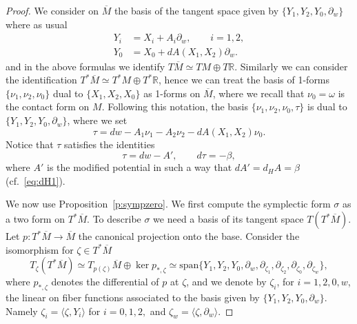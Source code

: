\documentclass{amsart}
\theoremstyle{plain}
\theoremstyle{definition}
\theoremstyle{remark}
\newcommand{\R}{\mathbb{R}}
\newcommand{\lift}[1]{\overline{#1}} 							%
\begin{document}
\begin{proof} We consider on $\lift M$ the basis of the tangent space given by $\{Y_{1},Y_{2},Y_{0},\partial_{w}\}$ where as usual
\begin{align}
Y_{i}&=X_{i}+A_{i}\partial_{w},\qquad i=1,2, \label{eq:db20} \\
Y_{0}&=X_{0}+dA(X_{1},X_{2})\partial_{w}.
\end{align}
and in the above formulas we identify $T \lift M\simeq  TM \oplus T\R$. Similarly we can consider the identification $T^{*}\lift M\simeq  T^{*}M \oplus T^{*}\R$, hence we can treat the basis of 1-forms $\{\nu_{1},\nu_{2},\nu_{0}\}$ dual to $\{X_{1},X_{2},X_{0}\}$ as 1-forms on $\lift M$, where we recall that $\nu_0=\omega$ is the contact form  on $M$. 
Following this notation, the basis $\{\nu_{1},\nu_{2},\nu_{0},\tau\}$ is dual to $\{Y_{1},Y_{2},Y_{0},\partial_{w}\}$, where we set
\begin{equation}\label{eq:tau1db}
\tau=dw-A_{1}\nu_{1}-A_{2}\nu_{2}-dA(X_{1},X_{2})\nu_{0}.
\end{equation}
Notice that $\tau$ satisfies the identities
\begin{equation}\label{eq:taudb}
\tau=dw-A',\qquad d\tau=-\beta,
\end{equation}
where $A'$ is the modified  potential in such a way that $dA'=d_{H}A=\beta$ (cf.\ \eqref{eq:dH1}).

We now use Proposition~\ref{p:sympzero}. We first compute the symplectic form $\sigma$ as a two form on $T^{*}\lift M$.  To describe $\sigma$ we need a basis of its tangent space $T(T^{*}\lift M)$. Let $p:T^{*}\lift M\to \lift M$ the canonical projection onto the base. Consider the isomorphism for $\zeta\in T^{*}\lift M$
\begin{equation}\label{eq:isomorfismodb}
T_{\zeta}(T^{*}\lift M)\simeq T_{p(\zeta)}\lift M\oplus \ker p_{*,\zeta}\simeq 
\mathrm{span}\{Y_{1},Y_{2},Y_{0},\partial_{w},	\partial_{\zeta_{1}},\partial_{\zeta_{2}},\partial_{\zeta_{0}},\partial_{\zeta_{w}}	
\}, 
\end{equation} 
where $p_{*,\zeta}$ denotes the differential of $p$ at $\zeta$, and we denote by $\zeta_{i}$, for $i=1,2,0,w$, the linear on fiber functions associated to the basis given by $\{Y_{1},Y_{2},Y_{0},\partial_{w}\}$. Namely $\zeta_{i}=\langle \zeta, Y_{i}\rangle$ for $i=0,1,2,$ and $\zeta_{w}=\langle \zeta, \partial_{w}\rangle$. %


\end{proof}
\end{document}
